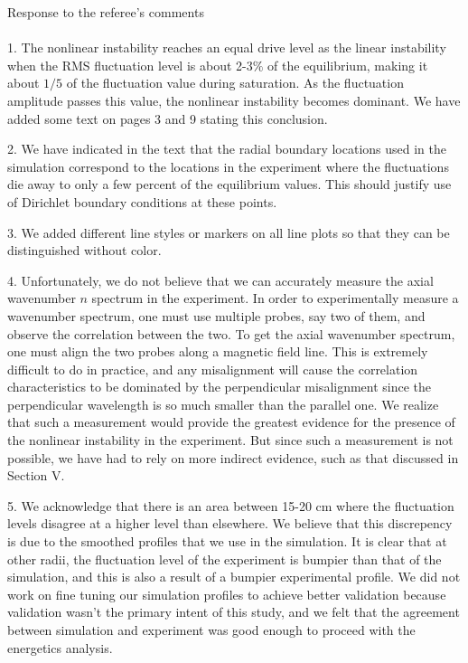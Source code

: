 \documentclass[12pt]{article}
\begin{document}
Response to the referee's comments \\ \\ 

1. The nonlinear instability reaches an equal drive level as the linear instability when the RMS fluctuation level is about 2-3$\%$ of the equilibrium, making it about $1/5$ 
of the fluctuation value during saturation. As the fluctuation amplitude passes this value, the nonlinear instability becomes dominant. We have added some text on pages 3 and
9 stating this conclusion.

2. We have indicated in the text that the radial boundary locations used in the simulation correspond to the locations in the experiment where the fluctuations die away to only
a few percent of the equilibrium values. This should justify use of Dirichlet boundary conditions at these points.

3. We added different line styles or markers on all line plots so that they can be distinguished without color.

4. Unfortunately, we do not believe that we can accurately measure the axial wavenumber $n$ spectrum in the experiment. In order to experimentally measure a wavenumber spectrum, one must
use multiple probes, say two of them, and observe the correlation between the two. To get the axial wavenumber spectrum, one must align the two probes along a magnetic field line.
This is extremely difficult to do in practice, and any misalignment will cause the correlation characteristics to be dominated by the perpendicular misalignment since the perpendicular
wavelength is so much smaller than the parallel one. We realize that such a measurement would provide the greatest
evidence for the presence of the nonlinear instability in the experiment. But since such a measurement is not possible, we have had to rely on more indirect evidence, such as that
discussed in Section V.

5. We acknowledge that there is an area between 15-20 cm where the fluctuation levels disagree at a higher level than elsewhere. We believe that this discrepency is due to the smoothed
profiles that we use in the simulation. It is clear that at other radii, the fluctuation level of the experiment is bumpier than that of the simulation, and this is also a result
of a bumpier experimental profile. We did not work on fine tuning our simulation profiles to achieve better validation because validation wasn't the primary intent of this study,
and we felt that the agreement between simulation and experiment was good enough to proceed with the energetics analysis.
\end{document}
